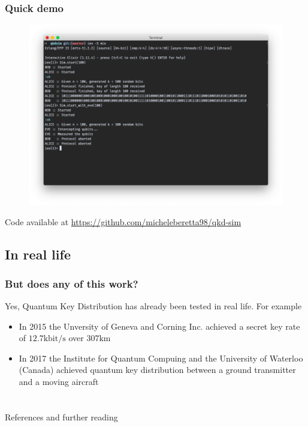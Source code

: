 \documentclass{beamer}
\begin{document}
  \begin{frame}
    \frametitle{Quick demo}
  
    \begin{center}
      \begin{figure}[H]
        \centering
        \includegraphics[width=0.8\linewidth]{qkd-bb84-elixir.png}
      \end{figure}

      \small{Code available at \url{https://github.com/micheleberetta98/qkd-sim}}
    \end{center}
  
  \end{frame}

  \subsection{In real life}
  \begin{frame}
    \frametitle{But does any of this work?}
    Yes, Quantum Key Distribution has already been tested in real life.
    For example
    \begin{itemize}
      \item In 2015 the Unversity of Geneva and Corning Inc. achieved a secret key
            rate of $12.7 \mathrm{kbit/s}$ over $307 \mathrm{km}$ \cite{qkd}
      \item In 2017 the Institute for Quantum Compuing and the University of Waterloo (Canada) achieved
            quantum key distribution between a ground transmitter and a moving aircraft \cite{airborne}
    \end{itemize}
  \end{frame}
  
  \section*{}
  \begin{frame}{References and further reading}
    \nocite{*}
    
    
  \end{frame}
\end{document}
